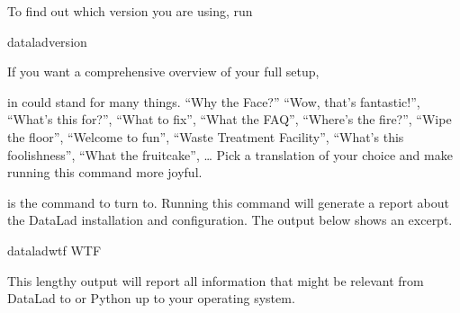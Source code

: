 \sphinxAtStartPar
To find out which version you are using, run

\begin{sphinxVerbatim}[commandchars=\\\{\}]
datalad\PYGZhy{}\PYGZhy{}version
\end{sphinxVerbatim}

\ignorespaces 
\sphinxAtStartPar
If you want a comprehensive overview of your full setup,
%
\begin{footnote}\sphinxAtStartFootnote
{} in  could stand for many things. “Why the Face?”
“Wow, that’s fantastic!”, “What’s this for?”, “What to fix”, “What the FAQ”,
“Where’s the fire?”, “Wipe the floor”, “Welcome to fun”,
“Waste Treatment Facility”, “What’s this foolishness”, “What the fruitcake”, …
Pick a translation of your choice and make running this command more joyful.
%
\end{footnote} is the command to turn to. Running this command will
generate a report about the DataLad installation and configuration.
The output below shows an excerpt.

\begin{sphinxVerbatim}[commandchars=\\\{\}]
dataladwtf
WTF
\end{sphinxVerbatim}

\sphinxAtStartPar
This lengthy output will report all information that might
be relevant \textendash{} from DataLad to {\hyperref[\detokenize{glossary:term-git-annex}]{}} or Python
up to your operating system.


